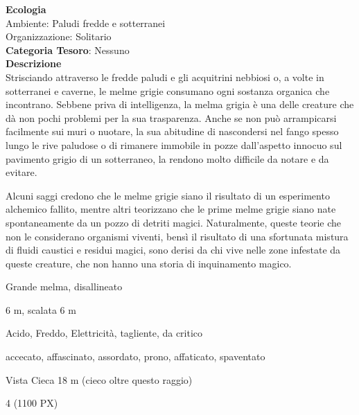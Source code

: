 \begin{multicols}{2}
{\textbf{Ecologia}\\
Ambiente: Paludi fredde e sotterranei\\
Organizzazione: Solitario\\
\textbf{Categoria Tesoro}: Nessuno\\
\textbf{Descrizione}\\
Strisciando attraverso le fredde paludi e gli acquitrini nebbiosi o, a volte in sotterranei e caverne, le melme grigie consumano ogni sostanza organica che incontrano. Sebbene priva di intelligenza, la melma grigia è una delle creature che dà non pochi problemi per la sua trasparenza. Anche se non può arrampicarsi facilmente sui muri o nuotare, la sua abitudine di nascondersi nel fango spesso lungo le rive paludose o di rimanere immobile in pozze dall'aspetto innocuo sul pavimento grigio di un sotterraneo, la rendono molto difficile da notare e da evitare.

Alcuni saggi credono che le melme grigie siano il risultato di un esperimento alchemico fallito, mentre altri teorizzano che le prime melme grigie siano nate spontaneamente da un pozzo di detriti magici. Naturalmente, queste teorie che non le considerano organismi viventi, bensì il risultato di una sfortunata mistura di fluidi caustici e residui magici, sono derisi da chi vive nelle zone infestate da queste creature, che non hanno una storia di inquinamento magico.

\begin{description}[noitemsep, topsep=0pt, parsep=0pt, partopsep=0pt, itemsep=1pt, leftmargin=2.35cm,  labelwidth=2.2cm, itemindent=0cm, listparindent=0pt] %
\setlength{\baselineskip}{10pt}
\item[\textbf{Taglia/Tipo}] Grande melma, disallineato
\item[\textbf{Caratt.}] 
\item[\textbf{Punti Ferita}] 
\item[\textbf{Movimento}] 6 m, scalata 6 m
\item[\textbf{Tiri Salvez.}] 
\item[\textbf{Imm. Danni}] Acido, Freddo, Elettricità, tagliente, da critico
\item[\textbf{Immunità}] accecato, affascinato, assordato, prono, affaticato, spaventato
\item[\textbf{Sensi}] Vista Cieca 18 m (cieco oltre questo raggio)
\item[\textbf{Sfida}] 4 (1100 PX)
\end{description}
\smallskip

}
\end{multicols}
